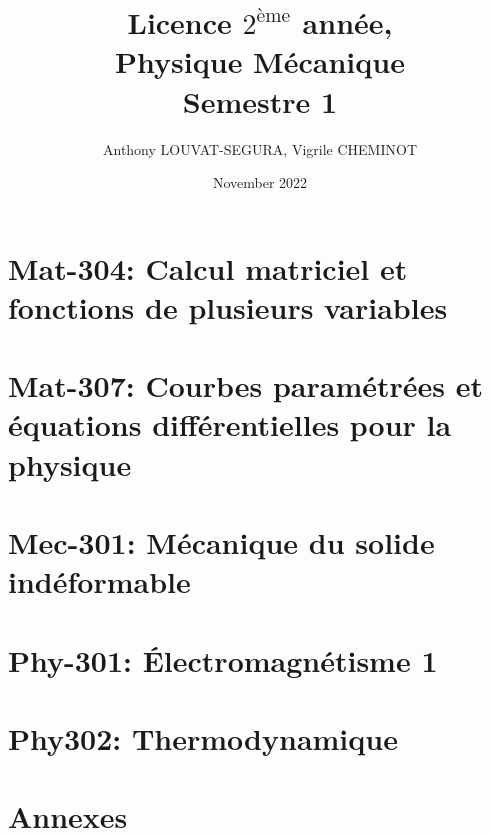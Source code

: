 \documentclass[a4paper, 12pt, openright, twoside, french]{book}
\title{Licence $2^{\text{ème}}$ année,\\Physique Mécanique\\ Semestre 1}
\author{Anthony LOUVAT-SEGURA, Vigrile CHEMINOT}
\date{November 2022}
\begin{document}
\maketitle
\tableofcontents
\part{Mat-304: Calcul matriciel et fonctions de plusieurs variables}

\newpage
\part{Mat-307: Courbes paramétrées et équations différentielles pour la physique}

\part{Mec-301: Mécanique du solide indéformable}

\part{Phy-301: Électromagnétisme 1}

\part{Phy302: Thermodynamique}

\part{Annexes}
%
\end{document}
